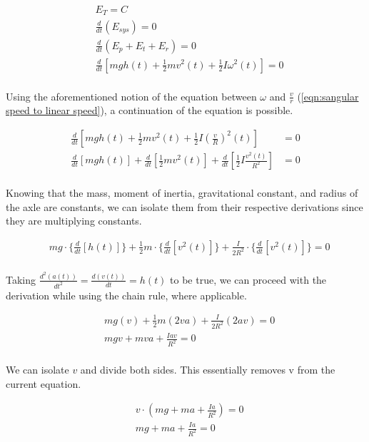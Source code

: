 \documentclass{article}
\begin{document}
\begin{align*}
& E_T=C \\
& \frac{d}{d t}\left(E_{sys}\right)=0 \\
& \frac{d}{d t}\left(E_p+E_t+E_r\right)=0 \\
& \frac{d}{d t}\left[m g h(t)+\frac{1}{2} m v^2(t)+\frac{1}{2} I \omega^2(t)\right]=0\\
\end{align*}

Using the aforementioned notion of the equation between $\omega$ and $\frac{v}{r}$ (\ref{eqn:sangular speed to linear speed}), a continuation of the equation is possible.

\begin{align*}
\frac{d}{d t}\left[m g h(t)+\frac{1}{2} m v^2(t)+\frac{1}{2} I \left(\frac{v}{R}\right)^2(t)\right]&=0 \\
\frac{d}{d t}\left[m g h(t)\right]+\frac{d}{d t}\left[\frac{1}{2} m v^2(t)\right]+\frac{d}{d t}\left[\frac{1}{2} I \frac{v^2(t)}{R^2}\right]&=0\\
\end{align*}

Knowing that the mass, moment of inertia, gravitational constant, and radius of the axle are constants, we can isolate them from their respective derivations since they are multiplying constants.

\begin{align*}
& m g \cdot \biggl\{\frac{d}{d t}[h(t)]\biggl\} + \frac{1}{2} m \cdot\biggl\{\frac{d}{d t}[v^2(t)]\biggl\}+\frac{I}{2R^2}\cdot\biggl\{\frac{d}{d t}\left[v^2(t)\right]\biggl\}=0\\
\end{align*}

Taking $\frac{d^2(a(t))}{{dt}^2} = \frac{d(v(t))}{dt} = h(t)$ to be true, we can proceed with the derivation while using the chain rule, where applicable.

\begin{align*}
& m g (v)+\frac{1}{2} m (2 v a)+\frac{I}{2R^2} (2 a v) = 0\\
& m g v+ m v a+\frac{Iav}{R^2} = 0\\
\end{align*}

We can isolate $v$ and divide both sides. This essentially removes v from the current equation.

\begin{align*}
& v\cdot\left(m g + m a+\frac{Ia}{R^2}\right) = 0\\
& m g + m a+\frac{Ia}{R^2} = 0\\
\end{align*}
\end{document}
